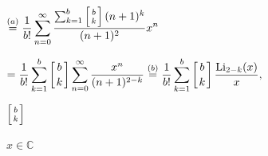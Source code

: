 \documentclass{article}
\def\lthtmlcheckvsize{\ifdim\ht\sizebox<\vsize 
  \ifdim\wd\sizebox<\hsize\expandafter\hfill\fi \expandafter\vfill
  \else\expandafter\vss\fi}%
\begin{document}
{\newpage\clearpage
{}%
$\displaystyle \overset{(a)}{=} \frac{1}{b!} \sum^{\infty}_{n=0} \frac{\sum^{b}_{k=1}\left[ b \atop k \right](n+1)^k}{(n+1)^2} x^n\nonumber$%
\lthtmlindisplaymathZ
\lthtmlcheckvsize\clearpage}

{\newpage\clearpage
{}%
$\displaystyle = \frac{1}{b!} \sum^{b}_{k=1}\left[ b \atop k \right] \sum^{\infty}_{n=0}  \frac{x^n}{(n+1)^{2-k}} \overset{(b)}{=} \frac{1}{b!}\sum^{b}_{k=1} \left[ b \atop k \right]\frac{\text{Li}_{2-k}(x)}{x},$%
\lthtmlindisplaymathZ
\lthtmlcheckvsize\clearpage}

{\newpage\clearpage
{}%
$ \left[ b \atop k \right]$%
\lthtmlindisplaymathZ
\lthtmlcheckvsize\clearpage}

{\newpage\clearpage
{}%
$ x \in \mathbb{C}$%
\lthtmlindisplaymathZ
\lthtmlcheckvsize\clearpage}
\end{document}
